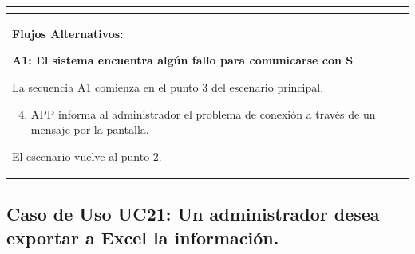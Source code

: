\begin{longtable}{|l|p{5.5cm}|l|p{2cm}|l|p{1.9cm}|}
{    } \\ \hline

    \multicolumn{6}{|p{15cm}|}{ \textbf{Flujos Alternativos: }
    
    \textbf{A1: El sistema encuentra algún fallo para comunicarse con S}
    
    La secuencia A1 comienza en el punto 3 del escenario principal.
    \begin{enumerate}
        \setcounter{enumi}{3}
        \item APP informa al administrador el problema de conexión a través de un mensaje por la pantalla.
    \end{enumerate}

    El escenario vuelve al punto 2.

    } \\ \hline

\end{longtable}


\subsection{Caso de Uso UC21: Un administrador desea exportar a Excel la información.}

